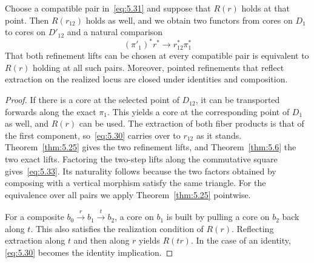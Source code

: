 \begin{proposition}\label{prop:5.27}

Choose a compatible pair in~\eqref{eq:5.31} and suppose that $R(r)$ holds at that point.
Then $R(r_{12})$ holds as well, and we obtain two functors from cores on $D_1$ to cores on
$D'_{12}$ and a natural comparison
\begin{equation*}
(\pi'_1)^*r^*
\longrightarrow r_{12}^*\pi_1^*
\tag{5.33}\label{eq:5.33}
\end{equation*}
That both refinement lifts can be chosen at every compatible pair is equivalent to $R(r)$
holding at all such pairs. Moreover, pointed refinements that reflect extraction on the
realized locus are closed under identities and composition.

\end{proposition}

\begin{proof}

If there is a core at the selected point of $D_{12}$, it can be transported forwards along
the exact $\pi_1$. This yields a core at the corresponding point of $D_1$ as well, and
$R(r)$ can be used. The extraction of both fiber products is that of the first component,
so~\eqref{eq:5.30} carries over to $r_{12}$ as it stands. Theorem~\ref{thm:5.25} gives the
two refinement lifts, and Theorem~\ref{thm:5.6} the two exact lifts. Factoring the two-step
lifts along the commutative square gives~\eqref{eq:5.33}. Its naturality follows because
the two factors obtained by composing with a vertical morphism satisfy the same triangle.
For the equivalence over all pairs we apply Theorem~\ref{thm:5.25} pointwise.

For a composite $b_0\xrightarrow{r}b_1\xrightarrow{t}b_2$, a core on $b_1$ is built by
pulling a core on $b_2$ back along $t$. This also satisfies the realization condition of
$R(r)$. Reflecting extraction along $t$ and then along $r$ yields $R(tr)$. In the case of
an identity, \eqref{eq:5.30} becomes the identity implication.

\end{proof}

